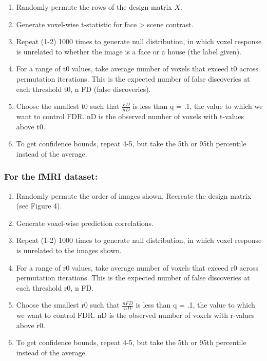 \documentclass[11pt,notitlepage]{article}
\begin{document}
\begin{enumerate}

\item Randomly permute the rows of the design matrix $X$.
\item Generate voxel-wise t-statistic for face > scene contrast.
\item Repeat (1-2) 1000 times to generate null distribution, in which voxel response is unrelated to whether the image is a face or a house (the label given).
\item For a range of t0 values, take average number of voxels that exceed t0 across permutation iterations. This is the expected number of false discoveries at each threshold t0, n FD (false discoveries).
\item Choose the smallest t0 such that $ \frac{FD}{nD}$ is less than q = .1, the value to which we want to control FDR. nD is the observed number of voxels with t-values above t0. 
\item To get confidence bounds, repeat 4-5, but take the 5th or 95th percentile instead of the average. 

\end{enumerate}

\subsubsection*{For the fMRI dataset:}

\begin{enumerate}
\item Randomly permute the order of images shown. Recreate the design matrix (see Figure 4).
\item Generate voxel-wise prediction correlations.
\item Repeat (1-2) 1000 times to generate null distribution, in which voxel response is unrelated to the images shown.
\item For a range of r0 values, take average number of voxels that exceed r0 across permutation iterations. This is the expected number of false discoveries at each threshold r0, n FD.
\item Choose the smallest r0 such that $ \frac{nFD}{nD}$ is less than q = .1, the value to which we want to control FDR. nD is the observed number of voxels with r-values above r0. 
\item To get confidence bounds, repeat 4-5, but take the 5th or 95th percentile instead of the average. 

\end{enumerate}
\end{document}
